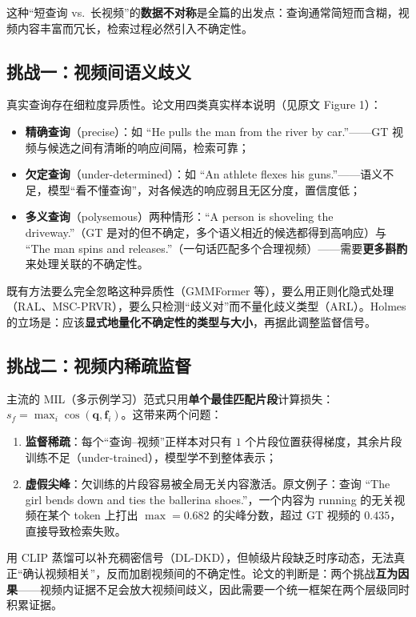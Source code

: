 \documentclass[11pt,a4paper,UTF8,fontset=windows]{ctexart}
\newcommand{\term}[1]{\textbf{#1}}
\newcommand{\vect}[1]{\boldsymbol{#1}}
\begin{document}
这种“短查询 vs.\ 长视频”的\term{数据不对称}是全篇的出发点：查询通常简短而含糊，视频内容丰富而冗长，检索过程必然引入不确定性。

\subsection{挑战一：视频间语义歧义}

真实查询存在细粒度异质性。论文用四类真实样本说明（见原文 Figure 1）：
\begin{itemize}[itemsep=1pt,topsep=2pt]
  \item \term{精确查询}（precise）：如 “He pulls the man from the river by car.”——GT 视频与候选之间有清晰的响应间隔，检索可靠；
  \item \term{欠定查询}（under-determined）：如 “An athlete flexes his guns.”——语义不足，模型“看不懂查询”，对各候选的响应弱且无区分度，置信度低；
  \item \term{多义查询}（polysemous）两种情形：“A person is shoveling the driveway.”（GT 是对的但不确定，多个语义相近的候选都得到高响应）与 “The man spins and releases.”（一句话匹配多个合理视频）——需要\term{更多斟酌}来处理关联的不确定性。
\end{itemize}

既有方法要么完全忽略这种异质性（GMMFormer 等），要么用正则化隐式处理（RAL、MSC-PRVR），要么只检测“歧义对”而不量化歧义类型（ARL）。Holmes 的立场是：应该\term{显式地量化不确定性的类型与大小}，再据此调整监督信号。

\subsection{挑战二：视频内稀疏监督}

主流的 MIL（多示例学习）范式只用\term{单个最佳匹配片段}计算损失：$s_f=\max_i \cos(\vect q,\vect f_i)$。这带来两个问题：
\begin{enumerate}[itemsep=1pt,topsep=2pt]
  \item \term{监督稀疏}：每个“查询–视频”正样本对只有 $1$ 个片段位置获得梯度，其余片段训练不足（under-trained），模型学不到整体表示；
  \item \term{虚假尖峰}：欠训练的片段容易被全局无关内容激活。原文例子：查询 “The girl bends down and ties the ballerina shoes.”，一个内容为 running 的无关视频在某个 token 上打出 $\max=0.682$ 的尖峰分数，超过 GT 视频的 $0.435$，直接导致检索失败。
\end{enumerate}

用 CLIP 蒸馏可以补充稠密信号（DL-DKD），但帧级片段缺乏时序动态，无法真正“确认视频相关”，反而加剧视频间的不确定性。论文的判断是：两个挑战\term{互为因果}——视频内证据不足会放大视频间歧义，因此需要一个统一框架在两个层级同时积累证据。
\end{document}
